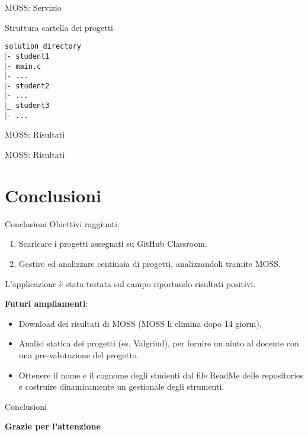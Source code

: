 \documentclass{beamer}
\newcommand\tab[1][1cm]{\hspace*{#1}}	%
\begin{document}
	\begin{frame}{MOSS: Servizio}
		\begin{block}{Struttura cartella dei progetti}
		 	\begin{tcolorbox}
				\texttt{\tab solution\_directory\\ 
					\tab $\vert$- student1\\
					\tab[1.5cm] $\vert$- main.c\\
					\tab[1.5cm] $\vert$- ...\\
					\tab $\vert$- student2\\
					\tab[1.5cm] $\vert$- ...\\
					\tab $\vert$\_ student3\\
					\tab[1.5cm] $\vert$- ...
				}
			\end{tcolorbox}
		\end{block}
	\end{frame}
	
	\begin{frame}{MOSS: Risultati}
		\begin{center}
		\end{center}
	\end{frame}

	\begin{frame}{MOSS: Risultati}
		\begin{figure}
		\end{figure}
	\end{frame}
	\section{Conclusioni}

	
	\begin{frame}{Conclusioni}
		Obiettivi raggiunti:
		\begin{enumerate}
			\item Scaricare i progetti assegnati su GitHub Classroom.
			\item Gestire ed analizzare centinaia di progetti, analizzandoli tramite MOSS.
		\end{enumerate}
		L'applicazione è stata testata sul campo riportando risultati positivi.
		\pause
		
		\vspace{0.5cm}
		{\small \textbf{Futuri ampliamenti}:
		\begin{itemize}
			\item Download dei risultati di MOSS (MOSS li elimina dopo 14 giorni).
			\item Analisi statica dei progetti (es. Valgrind), per fornire un aiuto al docente con una pre-valutazione del progetto.
			\item Ottenere il nome e il cognome degli studenti dal file ReadMe delle repositories e costruire dinamicamente un gestionale degli strumenti.
		\end{itemize}}
	\end{frame}

	\begin{frame}{Conclusioni}
		\begin{center}
			{\Huge \textcolor{rossoPantano}{\textbf{Grazie per l'attenzione}}}
		\end{center}
		
	\end{frame}
\end{document}
